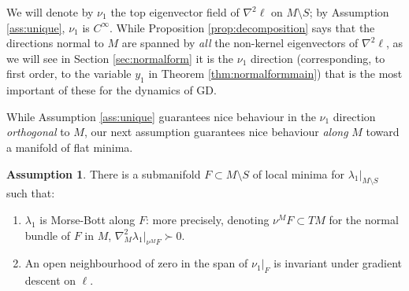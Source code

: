 \documentclass{article}
\theoremstyle{plain}
\theoremstyle{definition}
\newtheorem{assumption}[theorem]{Assumption}
\theoremstyle{remark}
\begin{document}
We will denote by $\nu_1$ the top eigenvector field of $\nabla^2\ell$ on $M\setminus S$; by Assumption \ref{ass:unique}, $\nu_1$ is $C^{\infty}$. While Proposition \ref{prop:decomposition} says that the directions normal to $M$ are spanned by \emph{all} the non-kernel eigenvectors of $\nabla^2\ell$, as we will see in Section \ref{sec:normalform} it is the $\nu_1$ direction (corresponding, to first order, to the variable $y_1$ in Theorem \ref{thm:normalformmain}) that is the most important of these for the dynamics of GD.

While Assumption \ref{ass:unique} guarantees nice behaviour in the $\nu_1$ direction \emph{orthogonal} to $M$, our next assumption guarantees nice behaviour \emph{along} $M$ toward a manifold of flat minima.

\begin{assumption}\label{ass:morsebott}
    There is a submanifold $F\subset M\setminus S$ of local minima for $\lambda_1|_{M\setminus S}$ such that:
    \begin{enumerate}[leftmargin=1.5em]
        \item $\lambda_1$ is Morse-Bott along $F$: more precisely, denoting $\nu^MF\subset TM$ for the normal bundle of $F$ in $M$, $\nabla_M^2\lambda_1|_{\nu^MF}\succ 0$.
        \item An open neighbourhood of zero in the span of $\nu_1|_{F}$ is invariant under gradient descent on $\ell$.
    \end{enumerate}
\end{assumption}
\end{document}
